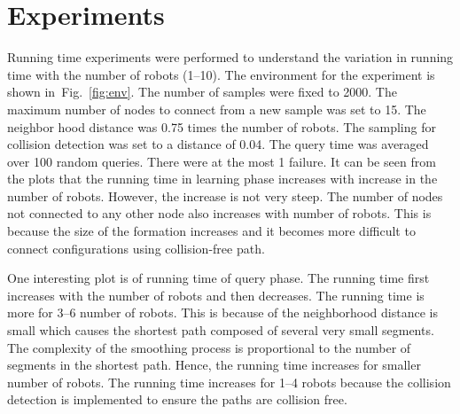 \documentclass[12pt,a4paper, onecolumn]{IEEEtran}
\newcommand{\fgref}[1]{Fig.~\ref{#1}}
\begin{document}
\section{Experiments}
Running time experiments were performed to understand the variation in running time with
the number of robots (1--10). The environment for the experiment is shown in~\fgref{fig:env}. The
number of samples were fixed to 2000. The maximum number of nodes to connect  from a new
sample was set to 15. The neighbor hood distance was 0.75 times the number of robots. The
sampling for collision detection was set to a distance of 0.04. The query time was
averaged over 100 random queries. There were at the most 1 failure. It can be seen from
the plots that the running time in learning phase increases with increase in the number of robots. However,
the increase is not very steep. The number of nodes not connected to any other node also
increases with number of robots. This is because the size of the formation increases and
it becomes more difficult to connect configurations using collision-free path.

One interesting plot is of running time of query phase. The running time first increases
with the number of robots and then decreases. The running time is more for
3--6 number of robots. This is because of the neighborhood distance is small 
which causes the shortest path composed of several very small
segments. The complexity of the smoothing process is proportional to the number of
segments in the shortest path. Hence, the running time increases for smaller number of
robots. The running time increases for 1--4 robots because the collision detection is
implemented to ensure the paths are collision free.
\end{document}
